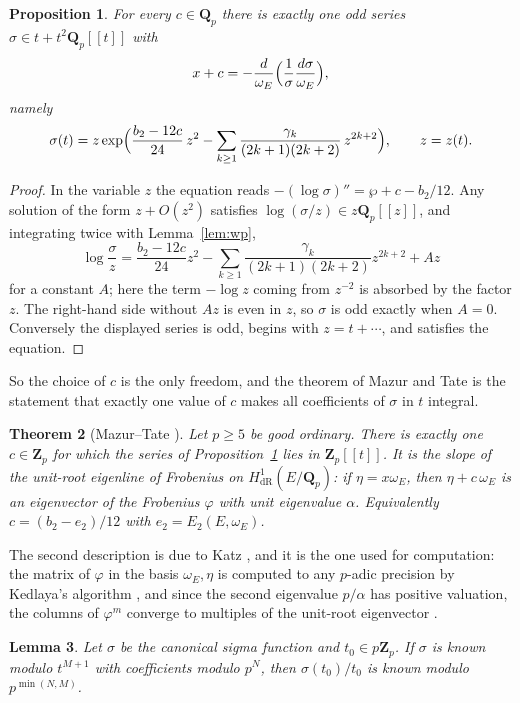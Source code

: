 \documentclass[11pt]{amsart}
\newtheorem{theorem}{Theorem}[section]
\newtheorem{proposition}[theorem]{Proposition}
\newtheorem{lemma}[theorem]{Lemma}
\theoremstyle{definition}
\newcommand{\Zp}{\mathbf{Z}_p}
\newcommand{\Qp}{\mathbf{Q}_p}
\begin{document}
\begin{proposition}\label{prop:sigmaclosed}
For every $c\in\Qp$ there is exactly one odd series $\sigma\in t+t^2\Qp[[t]]$ with
\[
x+c=-\frac{d}{\omega_E}\Bigl(\frac1\sigma\frac{d\sigma}{\omega_E}\Bigr),
\]
namely
\[
\sigma(t)=z\exp\Bigl(\frac{b_2-12c}{24}\,z^2-\sum_{k\ge1}\frac{\gamma_k}{(2k+1)(2k+2)}\,z^{2k+2}\Bigr),\qquad z=z(t).
\]
\end{proposition}

\begin{proof}
In the variable $z$ the equation reads $-(\log\sigma)''=\wp+c-b_2/12$. Any solution of the form $z+O(z^2)$ satisfies $\log(\sigma/z)\in z\Qp[[z]]$, and integrating twice with Lemma~\ref{lem:wp},
\[
\log\frac\sigma z=\frac{b_2-12c}{24}z^2-\sum_{k\ge1}\frac{\gamma_k}{(2k+1)(2k+2)}z^{2k+2}+Az
\]
for a constant $A$; here the term $-\log z$ coming from $z^{-2}$ is absorbed by the factor $z$. The right-hand side without $Az$ is even in $z$, so $\sigma$ is odd exactly when $A=0$. Conversely the displayed series is odd, begins with $z=t+\cdots$, and satisfies the equation.
\end{proof}

So the choice of $c$ is the only freedom, and the theorem of Mazur and Tate is the statement that exactly one value of $c$ makes all coefficients of $\sigma$ in $t$ integral.

\begin{theorem}[Mazur--Tate {\cite{MT91}}]\label{thm:mt}
Let $p\ge5$ be good ordinary. There is exactly one $c\in\Zp$ for which the series of Proposition~\ref{prop:sigmaclosed} lies in $\Zp[[t]]$. It is the slope of the unit-root eigenline of Frobenius on $H^1_{\mathrm{dR}}(E/\Qp)$: if $\eta=x\omega_E$, then $\eta+c\,\omega_E$ is an eigenvector of the Frobenius $\varphi$ with unit eigenvalue $\alpha$. Equivalently $c=(b_2-e_2)/12$ with $e_2=E_2(E,\omega_E)$.
\end{theorem}

The second description is due to Katz \cite{Kat76}, and it is the one used for computation: the matrix of $\varphi$ in the basis $\omega_E,\eta$ is computed to any $p$-adic precision by Kedlaya's algorithm \cite{Ked01}, and since the second eigenvalue $p/\alpha$ has positive valuation, the columns of $\varphi^m$ converge to multiples of the unit-root eigenvector \cite[\S3]{MST06}.

\begin{lemma}\label{lem:sigmaconv}
Let $\sigma$ be the canonical sigma function and $t_0\in p\Zp$. If $\sigma$ is known modulo $t^{M+1}$ with coefficients modulo $p^N$, then $\sigma(t_0)/t_0$ is known modulo $p^{\min(N,M)}$.
\end{lemma}
\end{document}
